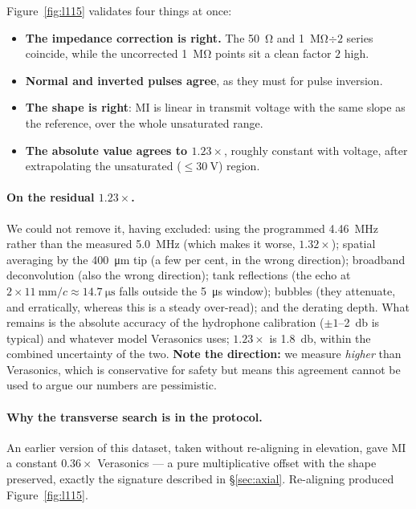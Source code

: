 \documentclass[11pt,a4paper]{article}
\newcommand{\good}[1]{\textcolor{green!45!black}{\textbf{#1}}}
\newcommand{\caveat}[1]{\textcolor{orange!75!black}{\textbf{#1}}}
\begin{document}
Figure~\ref{fig:l115} validates four things at once:
\begin{itemize}
  \item \good{The impedance correction is right.} The \SI{50}{\ohm} and \SI{1}{\mega\ohm}$\div2$
    series coincide, while the uncorrected \SI{1}{\mega\ohm} points sit a clean factor $2$ high.
  \item \good{Normal and inverted pulses agree}, as they must for pulse inversion.
  \item \good{The shape is right}: MI is linear in transmit voltage with the same slope as the
    reference, over the whole unsaturated range.
  \item \good{The absolute value agrees to $1.23\times$}, roughly constant with voltage, after
    extrapolating the unsaturated ($\le\SI{30}{\volt}$) region.
\end{itemize}

\paragraph{On the residual $1.23\times$.} We could not remove it, having excluded: using the
programmed \SI{4.46}{\mega\hertz} rather than the measured \SI{5.0}{\mega\hertz} (which makes it
worse, $1.32\times$); spatial averaging by the \SI{400}{\micro\metre} tip (a few per cent, in the
wrong direction); broadband deconvolution (also the wrong direction); tank reflections (the echo at
$2\times\SI{11}{\milli\metre}/c\approx\SI{14.7}{\micro\second}$ falls outside the
\SI{5}{\micro\second} window); bubbles (they attenuate, and erratically, whereas this is a steady
over-read); and the derating depth. What remains is the absolute accuracy of the hydrophone
calibration ($\pm1$--\SI{2}{\decibel} is typical) and whatever model Verasonics uses;
$1.23\times$ is \SI{1.8}{\decibel}, within the combined uncertainty of the two. \caveat{Note the
direction:} we measure \emph{higher} than Verasonics, which is conservative for safety but means this
agreement cannot be used to argue our numbers are pessimistic.

\paragraph{Why the transverse search is in the protocol.} An earlier version of this dataset, taken
without re-aligning in elevation, gave MI a constant $0.36\times$ Verasonics --- a pure
multiplicative offset with the shape preserved, exactly the signature described in
\S\ref{sec:axial}. Re-aligning produced Figure~\ref{fig:l115}.
\end{document}
